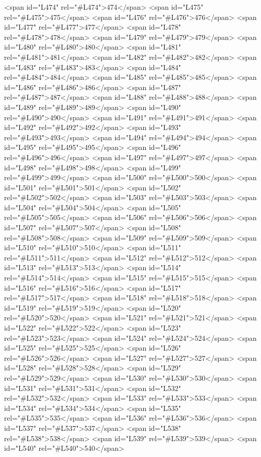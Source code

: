 <span id="L474" rel="#L474">474</span>
<span id="L475" rel="#L475">475</span>
<span id="L476" rel="#L476">476</span>
<span id="L477" rel="#L477">477</span>
<span id="L478" rel="#L478">478</span>
<span id="L479" rel="#L479">479</span>
<span id="L480" rel="#L480">480</span>
<span id="L481" rel="#L481">481</span>
<span id="L482" rel="#L482">482</span>
<span id="L483" rel="#L483">483</span>
<span id="L484" rel="#L484">484</span>
<span id="L485" rel="#L485">485</span>
<span id="L486" rel="#L486">486</span>
<span id="L487" rel="#L487">487</span>
<span id="L488" rel="#L488">488</span>
<span id="L489" rel="#L489">489</span>
<span id="L490" rel="#L490">490</span>
<span id="L491" rel="#L491">491</span>
<span id="L492" rel="#L492">492</span>
<span id="L493" rel="#L493">493</span>
<span id="L494" rel="#L494">494</span>
<span id="L495" rel="#L495">495</span>
<span id="L496" rel="#L496">496</span>
<span id="L497" rel="#L497">497</span>
<span id="L498" rel="#L498">498</span>
<span id="L499" rel="#L499">499</span>
<span id="L500" rel="#L500">500</span>
<span id="L501" rel="#L501">501</span>
<span id="L502" rel="#L502">502</span>
<span id="L503" rel="#L503">503</span>
<span id="L504" rel="#L504">504</span>
<span id="L505" rel="#L505">505</span>
<span id="L506" rel="#L506">506</span>
<span id="L507" rel="#L507">507</span>
<span id="L508" rel="#L508">508</span>
<span id="L509" rel="#L509">509</span>
<span id="L510" rel="#L510">510</span>
<span id="L511" rel="#L511">511</span>
<span id="L512" rel="#L512">512</span>
<span id="L513" rel="#L513">513</span>
<span id="L514" rel="#L514">514</span>
<span id="L515" rel="#L515">515</span>
<span id="L516" rel="#L516">516</span>
<span id="L517" rel="#L517">517</span>
<span id="L518" rel="#L518">518</span>
<span id="L519" rel="#L519">519</span>
<span id="L520" rel="#L520">520</span>
<span id="L521" rel="#L521">521</span>
<span id="L522" rel="#L522">522</span>
<span id="L523" rel="#L523">523</span>
<span id="L524" rel="#L524">524</span>
<span id="L525" rel="#L525">525</span>
<span id="L526" rel="#L526">526</span>
<span id="L527" rel="#L527">527</span>
<span id="L528" rel="#L528">528</span>
<span id="L529" rel="#L529">529</span>
<span id="L530" rel="#L530">530</span>
<span id="L531" rel="#L531">531</span>
<span id="L532" rel="#L532">532</span>
<span id="L533" rel="#L533">533</span>
<span id="L534" rel="#L534">534</span>
<span id="L535" rel="#L535">535</span>
<span id="L536" rel="#L536">536</span>
<span id="L537" rel="#L537">537</span>
<span id="L538" rel="#L538">538</span>
<span id="L539" rel="#L539">539</span>
<span id="L540" rel="#L540">540</span>
